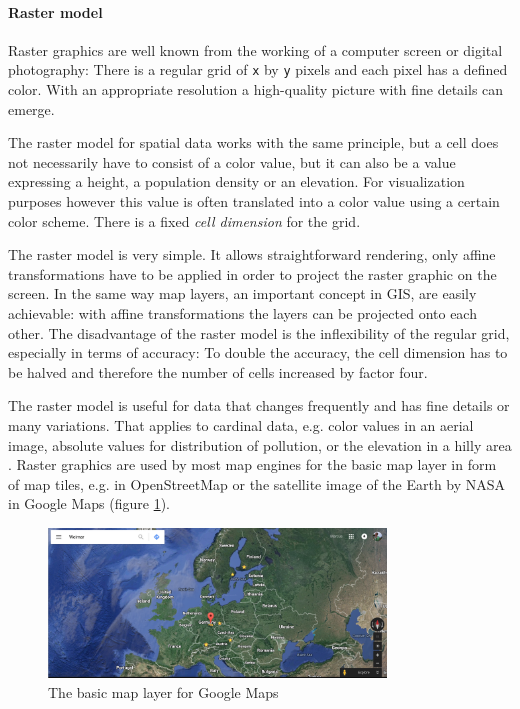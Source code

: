 \paragraph{Raster model} %
\label{par:raster_model}

Raster graphics are well known from the working of a computer screen or digital photography: There is a regular grid of \texttt{x} by \texttt{y} pixels and each pixel has a defined color. With an appropriate resolution a high-quality picture with fine details can emerge.

The raster model for spatial data works with the same principle, but a cell does not necessarily have to consist of a color value, but it can also be a value expressing a height, a population density or an elevation. For visualization purposes however this value is often translated into a color value using a certain color scheme. There is a fixed \emph{cell dimension} for the grid.

The raster model is very simple. It allows straightforward rendering, only affine transformations have to be applied in order to project the raster graphic on the screen. In the same way map layers, an important concept in GIS, are easily achievable: with affine transformations the layers can be projected onto each other. The disadvantage of the raster model is the inflexibility of the regular grid, especially in terms of accuracy: To double the accuracy, the cell dimension has to be halved and therefore the number of cells increased by factor four.

The raster model is useful for data that changes frequently and has fine details or many variations. That applies to cardinal data, e.g. color values in an aerial image, absolute values for distribution of pollution, or the elevation in a hilly area
\cite[pp.42-48]{bolstad2008gis}.
Raster graphics are used by most map engines for the basic map layer in form of map tiles, e.g. in OpenStreetMap or the satellite image of the Earth by NASA in Google Maps (figure \ref{fig:google_maps_satellite}).

\begin{figure}[ht]
  \centering
  \includegraphics[width=0.8\textwidth]{graphics/basics/google_maps_satellite.png}
  \caption{The basic map layer for Google Maps  \protect\footnotemark}
  \label{fig:google_maps_satellite}
\end{figure}

